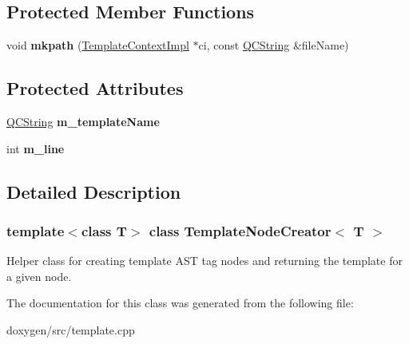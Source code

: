 \subsection*{Protected Member Functions}
\begin{DoxyCompactItemize}
\item 
\mbox{\label{class_template_node_creator_a63ad903edb4ece57c3e582d5e2aaa79e}} 
void {\bfseries mkpath} (\mbox{\hyperlink{class_template_context_impl}{Template\+Context\+Impl}} $\ast$ci, const \mbox{\hyperlink{class_q_c_string}{Q\+C\+String}} \&file\+Name)
\end{DoxyCompactItemize}
\subsection*{Protected Attributes}
\begin{DoxyCompactItemize}
\item 
\mbox{\label{class_template_node_creator_af6dac1a50abd17cf5529eab951020521}} 
\mbox{\hyperlink{class_q_c_string}{Q\+C\+String}} {\bfseries m\+\_\+template\+Name}
\item 
\mbox{\label{class_template_node_creator_a9a0ab03084f963594f0f2a058c4d7879}} 
int {\bfseries m\+\_\+line}
\end{DoxyCompactItemize}


\subsection{Detailed Description}
\subsubsection*{template$<$class T$>$\newline
class Template\+Node\+Creator$<$ T $>$}

Helper class for creating template A\+ST tag nodes and returning the template for a given node. 

The documentation for this class was generated from the following file\+:\begin{DoxyCompactItemize}
\item 
doxygen/src/template.\+cpp\end{DoxyCompactItemize}

